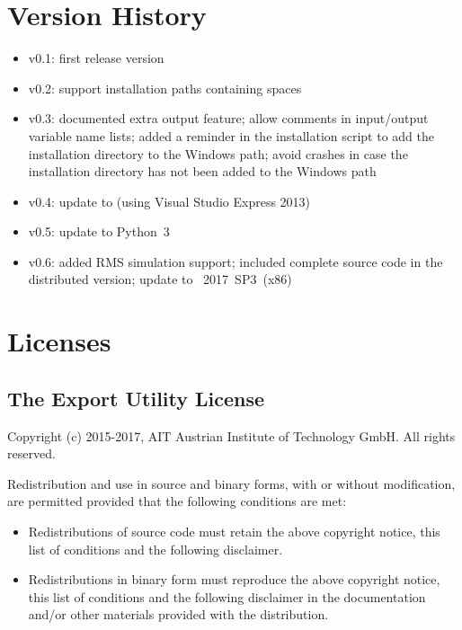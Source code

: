 

\chapter{Version History}

\begin{itemize}
  \item v0.1: first release version
  \item v0.2: support installation paths containing spaces %
  \item v0.3: documented extra output feature; allow comments in input/output variable name lists; added a reminder in the installation script to add the \pf installation directory to the Windows path; avoid crashes in case the \pf installation directory has not been added to the Windows path
  \item v0.4: update to  (using Visual Studio Express 2013)
  \item v0.5: update to Python~3
  \item v0.6: added RMS simulation support; included complete source code in the distributed version; update to \pf~2017~SP3~(x86)
\end{itemize}


\chapter{Licenses}

\section{The \fmipp \pf Export Utility License}
\label{pf_fmu_license}

Copyright (c) 2015-2017, AIT Austrian Institute of Technology GmbH. All
rights reserved.

Redistribution and use in source and binary forms, with or without
modification, are permitted provided that the following conditions are
met:

\begin{itemize}
\itemsep1pt\parskip0pt
\item
  Redistributions of source code must retain the above copyright notice,
  this list of conditions and the following disclaimer.
\item
  Redistributions in binary form must reproduce the above copyright
  notice, this list of conditions and the following disclaimer in the
  documentation and/or other materials provided with the distribution.
\end{itemize}

